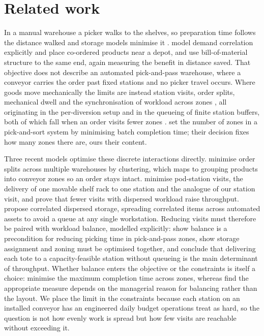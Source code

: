 \documentclass[]{interact}
\begin{document}
\section{Related work}\label{sec:litreview}
In a manual warehouse a picker walks to the shelves, so preparation time follows the distance walked and storage models minimise it \citep{islam2023, wang2020}. \citet{zhang2019cie} model demand correlation explicitly and place co-ordered products near a depot, and \citet{xiao2010correlated} use bill-of-material structure to the same end, again measuring the benefit in distance saved. That objective does not describe an automated pick-and-pass warehouse, where a conveyor carries the order past fixed stations and no picker travel occurs. Where goods move mechanically the limits are instead station visits, order splits, mechanical dwell and the synchronisation of workload across zones \citep{azadeh2019, xie2021}, all originating in the per-diversion setup and in the queueing of finite station buffers, both of which fall when an order visits fewer zones \citep{zhu2021, kim2020}. \citet{dekoster2012zones} set the number of zones in a pick-and-sort system by minimising batch completion time; their decision fixes how many zones there are, ours their content.

Three recent models optimise these discrete interactions directly. \citet{zhu2021} minimise order splits across multiple warehouses by clustering, which maps to grouping products into conveyor zones so an order stays intact. \citet{xie2021} minimise pod-station visits, the delivery of one movable shelf rack to one station and the analogue of our station visit, and prove that fewer visits with dispersed workload raise throughput. \citet{mirzaei2021} propose correlated dispersed storage, spreading correlated items across automated assets to avoid a queue at any single workstation. Reducing visits must therefore be paired with workload balance, modelled explicitly: \citet{tarczynski2023} show balance is a precondition for reducing picking time in pick-and-pass zones, \citet{vanGils2018} show storage assignment and zoning must be optimised together, and \citet{boysen2023} conclude that delivering each tote to a capacity-feasible station without queueing is the main determinant of throughput. Whether balance enters the objective or the constraints is itself a choice: \citet{saylam2023minmax} minimise the maximum completion time across zones, whereas \citet{vanheusden2022workload} find the appropriate measure depends on the managerial reason for balancing rather than the layout. We place the limit in the constraints because each station on an installed conveyor has an engineered daily budget operations treat as hard, so the question is not how evenly work is spread but how few visits are reachable without exceeding it.
\end{document}
